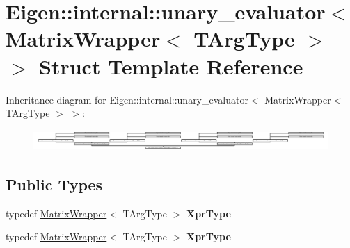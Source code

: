 \hypertarget{struct_eigen_1_1internal_1_1unary__evaluator_3_01_matrix_wrapper_3_01_t_arg_type_01_4_01_4}{}\section{Eigen\+:\+:internal\+:\+:unary\+\_\+evaluator$<$ Matrix\+Wrapper$<$ T\+Arg\+Type $>$ $>$ Struct Template Reference}
\label{struct_eigen_1_1internal_1_1unary__evaluator_3_01_matrix_wrapper_3_01_t_arg_type_01_4_01_4}
Inheritance diagram for Eigen\+:\+:internal\+:\+:unary\+\_\+evaluator$<$ Matrix\+Wrapper$<$ T\+Arg\+Type $>$ $>$\+:\begin{figure}[H]
\begin{center}
\leavevmode
\includegraphics[height=0.804598cm]{struct_eigen_1_1internal_1_1unary__evaluator_3_01_matrix_wrapper_3_01_t_arg_type_01_4_01_4}
\end{center}
\end{figure}
\subsection*{Public Types}
\begin{DoxyCompactItemize}
\item 
\mbox{\label{struct_eigen_1_1internal_1_1unary__evaluator_3_01_matrix_wrapper_3_01_t_arg_type_01_4_01_4_aad78899b387a72ae42afbf13dc006efa}} 
typedef \hyperlink{group___core___module_class_eigen_1_1_matrix_wrapper}{Matrix\+Wrapper}$<$ T\+Arg\+Type $>$ {\bfseries Xpr\+Type}
\item 
\mbox{\label{struct_eigen_1_1internal_1_1unary__evaluator_3_01_matrix_wrapper_3_01_t_arg_type_01_4_01_4_aad78899b387a72ae42afbf13dc006efa}} 
typedef \hyperlink{group___core___module_class_eigen_1_1_matrix_wrapper}{Matrix\+Wrapper}$<$ T\+Arg\+Type $>$ {\bfseries Xpr\+Type}
\end{DoxyCompactItemize}
